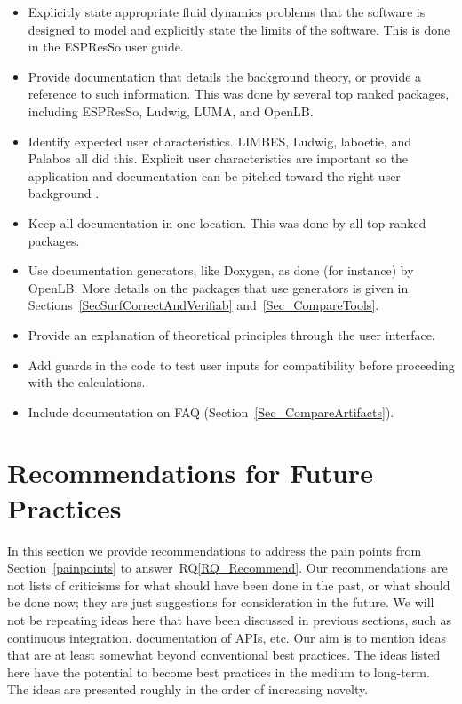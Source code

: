 \documentclass[final, 3p, times, authoryear]{elsarticle}
\newcommand{\rqref}[1]{RQ\ref{#1}}
\begin{document}
\begin{itemize}
	\item Explicitly state appropriate fluid dynamics problems that the software
	is designed to model and explicitly state the limits of the software. This
	is done in the ESPResSo user guide.
	\item Provide documentation that details the background theory, or provide a
	reference to such information. This was done by several top ranked packages,
	including ESPResSo, Ludwig, LUMA, and OpenLB.
	\item Identify expected user characteristics. LIMBES, Ludwig, laboetie, and
	Palabos all did this. Explicit user characteristics are important so the
	application and documentation can be pitched toward the right user
	background \citep{SmithEtAl2007}.
	\item Keep all documentation in one location. This was done by all top
	ranked packages.
	\item Use documentation generators, like Doxygen, as done (for instance) by
	OpenLB.  More details on the packages that use generators is given in
	Sections~\ref{SecSurfCorrectAndVerifiab} and~\ref{Sec_CompareTools}.
	\item Provide an explanation of theoretical principles through the user interface.
	\item Add guards in the code to test user inputs for compatibility before
	proceeding with the calculations.
	\item Include documentation on FAQ (Section~\ref{Sec_CompareArtifacts}).
\end{itemize}

\section{Recommendations for Future Practices} \label{Sec_Recommendations}

In this section we provide recommendations to address the pain points from
Section~\ref{painpoints} to answer~\rqref{RQ_Recommend}.  Our recommendations
are not lists of criticisms for what should have been done in the past, or what
should be done now; they are just suggestions for consideration in the future.
We will not be repeating ideas here that have been discussed in previous
sections, such as continuous integration, documentation of APIs, etc.  Our aim
is to mention ideas that are at least somewhat beyond conventional best
practices. The ideas listed here have the potential to become best practices in
the medium to long-term. The ideas are presented roughly in the order of
increasing novelty.
\end{document}
